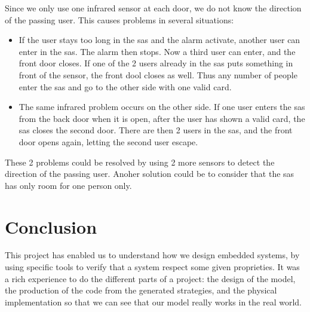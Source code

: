 
Since we only use one infrared sensor at each door, we do not know the direction of the passing user. This causes problems in several situations:

\begin{itemize}
	\item If the user stays too long in the sas and the alarm activate, another user can enter in the sas. The alarm then stops. Now a third user can enter, and the front door closes. If one of the 2 users already in the sas puts something in front of the sensor, the front dool closes as well. Thus any number of people enter the sas and go to the other side with one valid card.
    
    \item The same infrared problem occurs on the other side. If one user enters the sas from the back door when it is open, after the user has shown a valid card, the sas closes the second door. There are then 2 users in the sas, and the front door opens again, letting the second user escape.
	
\end{itemize}

These 2 problems could be resolved by using 2 more sensors to detect the direction of the passing user. Anoher solution could be to consider that the sas has only room for one person only.

\section{Conclusion}
This project has enabled us to understand how we design embedded systems, by using specific tools to verify that a system respect some given proprieties. It was a rich experience to do the different parts of a project: the design of the model, the production of the code from the generated strategies, and the physical implementation so that we can see that our model really works in the real world.





